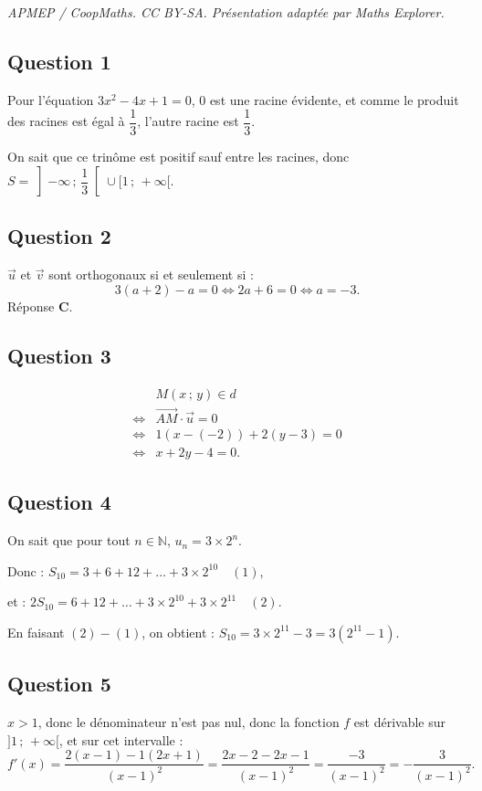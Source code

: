 \documentclass[10pt]{article}
\begin{document}
\noindent\textit{APMEP / CoopMaths. CC BY-SA. Présentation adaptée par Maths Explorer.}\par\medskip
\subsection*{Question 1}

Pour l'équation \(3x^2 - 4x + 1 = 0\), \(0\) est une racine évidente, et comme le produit des racines est égal à \(\dfrac{1}{3}\), l'autre racine est \(\dfrac{1}{3}\).

On sait que ce trinôme est positif sauf entre les racines, donc \(S = \left]-\infty\,;\,\dfrac{1}{3}\right[ \cup [1\,;\,+\infty[\).

\subsection*{Question 2}

\(\vec{u}\) et \(\vec{v}\) sont orthogonaux si et seulement si :
\[
3(a + 2) - a = 0 \iff 2a + 6 = 0 \iff a = -3.
\]
Réponse \(\textbf{C.}\)

\subsection*{Question 3}

\begin{align*}
&M(x\,;\,y) \in \textit{d} \\
\iff &\overrightarrow{AM} \cdot \vec{u} = 0 \\
\iff &1(x - (-2)) + 2(y - 3) = 0 \\
\iff &x + 2y - 4 = 0.
\end{align*}

\subsection*{Question 4}

On sait que pour tout \(n \in \mathbb{N}\), \(u_n = 3 \times 2^n\).

Donc : \(S_{10} = 3 + 6 + 12 + \dots + 3 \times 2^{10} \quad (1)\),

et : \(2S_{10} = 6 + 12 + \dots + 3 \times 2^{10} + 3 \times 2^{11} \quad (2)\).

En faisant \((2) - (1)\), on obtient : \(S_{10} = 3 \times 2^{11} - 3 = 3(2^{11} - 1)\).

\subsection*{Question 5}

\(x > 1\), donc le dénominateur n'est pas nul, donc la fonction \(f\) est dérivable sur \(]1\,;\,+\infty[\), et sur cet intervalle :
\[
f'(x) = \dfrac{2(x - 1) - 1(2x + 1)}{(x - 1)^2} = \dfrac{2x - 2 - 2x - 1}{(x - 1)^2} = \dfrac{-3}{(x - 1)^2} = -\dfrac{3}{(x - 1)^2}.
\]
\end{document}
